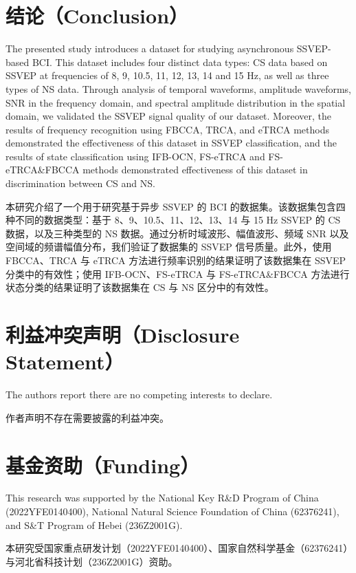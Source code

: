 \documentclass[11pt]{ctexart}
\newenvironment{en}{\begin{enbox}\color{black!85}}{\end{enbox}}
\newenvironment{zh}{\begin{zhbox}}{\end{zhbox}}
\begin{document}
\section{结论（Conclusion）}
\begin{en}
The presented study introduces a dataset for studying asynchronous SSVEP-based BCI. This dataset includes four distinct data types: CS data based on SSVEP at frequencies of 8, 9, 10.5, 11, 12, 13, 14 and 15 Hz, as well as three types of NS data. Through analysis of temporal waveforms, amplitude waveforms, SNR in the frequency domain, and spectral amplitude distribution in the spatial domain, we validated the SSVEP signal quality of our dataset. Moreover, the results of frequency recognition using FBCCA, TRCA, and eTRCA methods demonstrated the effectiveness of this dataset in SSVEP classification, and the results of state classification using IFB-OCN, FS-eTRCA and FS-eTRCA\&FBCCA methods demonstrated effectiveness of this dataset in discrimination between CS and NS.
\end{en}
\begin{zh}
本研究介绍了一个用于研究基于异步 SSVEP 的 BCI 的数据集。该数据集包含四种不同的数据类型：基于 8、9、10.5、11、12、13、14 与 15 Hz SSVEP 的 CS 数据，以及三种类型的 NS 数据。通过分析时域波形、幅值波形、频域 SNR 以及空间域的频谱幅值分布，我们验证了数据集的 SSVEP 信号质量。此外，使用 FBCCA、TRCA 与 eTRCA 方法进行频率识别的结果证明了该数据集在 SSVEP 分类中的有效性；使用 IFB-OCN、FS-eTRCA 与 FS-eTRCA\&FBCCA 方法进行状态分类的结果证明了该数据集在 CS 与 NS 区分中的有效性。
\end{zh}

\section*{利益冲突声明（Disclosure Statement）}
\begin{en}
The authors report there are no competing interests to declare.
\end{en}
\begin{zh}
作者声明不存在需要披露的利益冲突。
\end{zh}

\section*{基金资助（Funding）}
\begin{en}
This research was supported by the National Key R\&D Program of China (2022YFE0140400), National Natural Science Foundation of China (62376241), and S\&T Program of Hebei (236Z2001G).
\end{en}
\begin{zh}
本研究受国家重点研发计划（2022YFE0140400）、国家自然科学基金（62376241）与河北省科技计划（236Z2001G）资助。
\end{zh}
\end{document}
